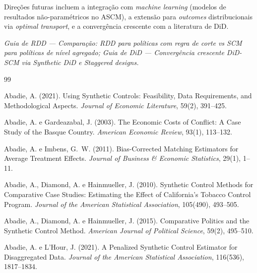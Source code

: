 \documentclass[12pt, a4paper, openany]{book}
\begin{document}
Direções futuras incluem a integração com \textit{machine learning} (modelos de resultados não-paramétricos no ASCM), a extensão para \textit{outcomes} distribucionais via \textit{optimal transport}, e a convergência crescente com a literatura de DiD.

\begin{conexaobox}
\textit{Guia de RDD --- Comparação: RDD para políticas com regra de corte vs SCM para políticas de nível agregado; Guia de DiD --- Convergência crescente DiD-SCM via Synthetic DiD e Staggered designs.}
\end{conexaobox}


\newpage


\begin{thebibliography}{99}

Abadie, A. (2021).
\newblock Using Synthetic Controls: Feasibility, Data Requirements, and Methodological Aspects.
\newblock \textit{Journal of Economic Literature}, 59(2), 391--425.

Abadie, A. e Gardeazabal, J. (2003).
\newblock The Economic Costs of Conflict: A Case Study of the Basque Country.
\newblock \textit{American Economic Review}, 93(1), 113--132.

Abadie, A. e Imbens, G.~W. (2011).
\newblock Bias-Corrected Matching Estimators for Average Treatment Effects.
\newblock \textit{Journal of Business \& Economic Statistics}, 29(1), 1--11.

Abadie, A., Diamond, A. e Hainmueller, J. (2010).
\newblock Synthetic Control Methods for Comparative Case Studies: Estimating the Effect of California's Tobacco Control Program.
\newblock \textit{Journal of the American Statistical Association}, 105(490), 493--505.

Abadie, A., Diamond, A. e Hainmueller, J. (2015).
\newblock Comparative Politics and the Synthetic Control Method.
\newblock \textit{American Journal of Political Science}, 59(2), 495--510.

Abadie, A. e L'Hour, J. (2021).
\newblock A Penalized Synthetic Control Estimator for Disaggregated Data.
\newblock \textit{Journal of the American Statistical Association}, 116(536), 1817--1834.


\end{thebibliography}
\end{document}

